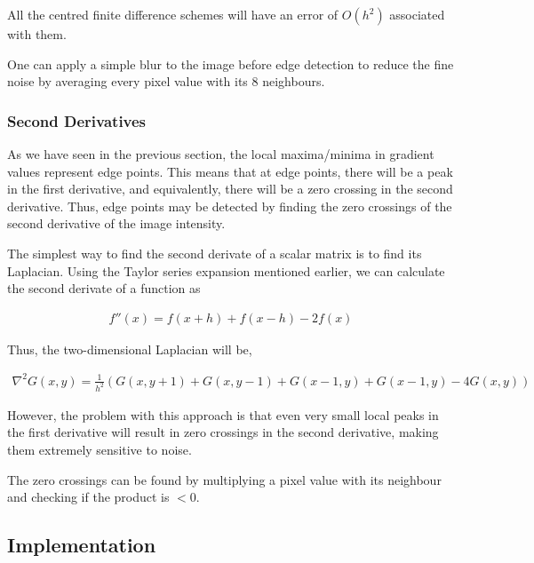 \noindent All the centred finite difference schemes will have an error of $O(h^2)$ associated with them.

One can apply a simple blur to the image before edge detection to reduce the fine noise by averaging every pixel value with its 8 neighbours.

\subsubsection{Second Derivatives}

As we have seen in the previous section, the local maxima/minima in gradient values represent edge points. This means that at edge points, there will be a peak in the first derivative, and equivalently, there will be a zero crossing in the second derivative. Thus, edge points may be detected by finding the zero crossings of the second derivative of the image intensity.

The simplest way to find the second derivate of a scalar matrix is to find its Laplacian. Using the Taylor series expansion mentioned earlier, we can calculate the second derivate of a function as 

\begin{align}
    f''(x) = f(x+h)+f(x-h)-2f(x)
\end{align}

Thus, the two-dimensional Laplacian will be,

\begin{align}
    \nabla^2 G(x,y) = \frac{1}{h^2}\left(G(x,y+1)+G(x,y-1)+G(x-1,y)+G(x-1,y)-4G(x,y)\right)
\end{align}

However, the problem with this approach is that even very small local peaks in the first derivative will result in zero crossings in the second derivative, making them extremely sensitive to noise.

The zero crossings can be found by multiplying a pixel value with its neighbour and checking if the product is $<0$.


\subsection{Implementation}

